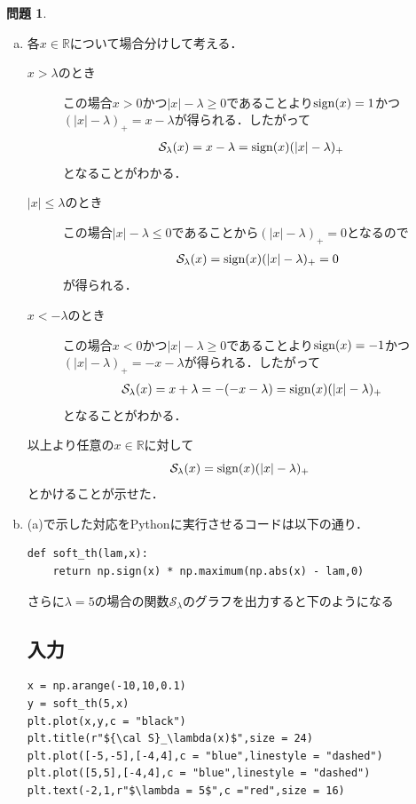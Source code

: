 \documentclass[titlepage]{jsarticle}
\theoremstyle{definition}
\newtheorem{Ex}{問題}
\theoremstyle{mystyle} %
\renewcommand{\footnotesize}{\normalsize}
\begin{document}
\begin{Ex}\mbox{}\\
\begin{enumerate}[(a)]
\item 各$x\in \mathbb{R}$について場合分けして考える．\\
\begin{description}
\item[$x>\lambda$のとき]
この場合$x>0$かつ$|x|-\lambda\geq 0$であることより${\rm sign}(x)=1$かつ$(|x|-\lambda)_+=x-\lambda$が得られる．したがって
\begin{align*}
\mathcal{S}_{\lambda}(x)&=x-\lambda={\rm sign}(x)(|x|-\lambda)_+
\end{align*}
となることがわかる．\\

\item[$|x|\leq \lambda$のとき]
この場合$|x|-\lambda\leq 0$であることから$(|x|-\lambda)_+=0$となるので
\begin{align*}
\mathcal{S}_{\lambda}(x)={\rm sign}(x)(|x|-\lambda)_+=0
\end{align*}
が得られる．\\

\item[$x<-\lambda$のとき]
この場合$x<0$かつ$|x|-\lambda \geq 0$であることより${\rm sign}(x)=-1$かつ$(|x|-\lambda)_+=-x-\lambda$が得られる．したがって
\begin{align*}
\mathcal{S}_{\lambda}(x)&=x+\lambda=-(-x-\lambda)={\rm sign}(x)(|x|-\lambda)_+
\end{align*}
となることがわかる．\\
\end{description}
以上より任意の$x\in \mathbb{R}$に対して
$$\mathcal{S}_{\lambda}(x)={\rm sign}(x)(|x|-\lambda)_+$$
とかけることが示せた．\\

\item (a)で示した対応をPythonに実行させるコードは以下の通り．
\begin{lstlisting}[basicstyle = \ttfamily\footnotesize, frame = single]
def soft_th(lam,x):
    return np.sign(x) * np.maximum(np.abs(x) - lam,0)
\end{lstlisting}
さらに$\lambda=5$の場合の関数$\mathcal{S}_{\lambda}$のグラフを出力すると下のようになる
\subsection*{入力}
\begin{lstlisting}[basicstyle = \ttfamily\footnotesize, frame = single]
x = np.arange(-10,10,0.1)
y = soft_th(5,x)
plt.plot(x,y,c = "black")
plt.title(r"${\cal S}_\lambda(x)$",size = 24)
plt.plot([-5,-5],[-4,4],c = "blue",linestyle = "dashed")
plt.plot([5,5],[-4,4],c = "blue",linestyle = "dashed")
plt.text(-2,1,r"$\lambda = 5$",c ="red",size = 16)
\end{lstlisting}


\end{enumerate}
\end{Ex}
\end{document}
